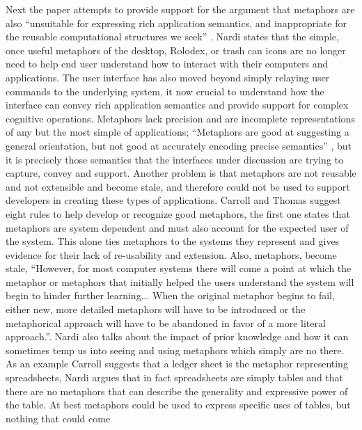 \documentclass{sig-alternate}
\begin{document}
Next the paper attempts to provide support for the argument that metaphors are
also ``unsuitable for expressing rich application semantics, and inappropriate
for the reusable computational structures we seek'' \cite{Nardi:BeyondModels}.
Nardi states that the simple, once useful metaphors of the desktop, Rolodex, or
trash can icons are no longer need to help end user understand how to interact
with their computers and applications. The user interface has also moved beyond
simply relaying user commands to the underlying system, it now crucial to
understand how the interface can convey rich application semantics and provide
support for complex cognitive operations. Metaphors lack precision and are
incomplete representations of any but the most simple of applications;
``Metaphors are good at suggesting a general orientation, but not good at
accurately encoding precise semantics'' \cite{Nardi:BeyondModels}, but it is
precisely those semantics that the interfaces under discussion are trying to
capture, convey and support. Another problem is that metaphors are not reusable
and not extensible and become stale, and therefore could not be used to support
developers in creating these types of applications. Carroll and Thomas
\cite{Carroll:MetaphorAndTheCognitiveRepresentation} suggest eight rules to help
develop or recognize good metaphors, the first one states that metaphors are
system dependent and must also account for the expected user of the system. This
alone ties metaphors to the systems they represent and gives evidence for their
lack of re-usability and extension. Also, metaphors, become stale, ``However,
for most computer systems there will come a point at which the metaphor or
metaphors that initially helped the users understand the system will begin to
hinder further learning... When the original metaphor begins to fail, either
new, more detailed metaphors will have to be introduced or the metaphorical
approach will have to be abandoned in favor of a more literal
approach.''\cite{Carroll:MetaphorAndTheCognitiveRepresentation}. Nardi also
talks about the impact of prior knowledge and how it can sometimes temp us into
seeing and using metaphors which simply are no there. As an example Carroll
\cite{Carroll:1988:InterfaceMetaphorsAndUserInterfaceDesign} suggests that a
ledger sheet is the metaphor representing spreadsheets, Nardi argues that in
fact spreadsheets are simply tables and that there are no metaphors that can
describe the generality and expressive power of the table. At best metaphors
could be used to express specific uses of tables, but nothing that could come
\end{document}
